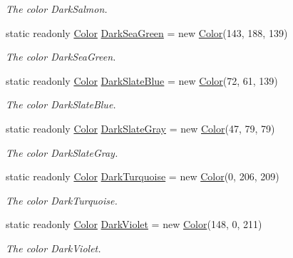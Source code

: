 \begin{DoxyCompactItemize}
\begin{DoxyCompactList}\small\item\em The color Dark\-Salmon. \end{DoxyCompactList}\item 
static readonly \hyperlink{struct_tri_devs_1_1_tri_engine_1_1_color}{Color} \hyperlink{struct_tri_devs_1_1_tri_engine_1_1_color_ace9287f842fa7ca4ad3a1d3e8cf9c90e}{Dark\-Sea\-Green} = new \hyperlink{struct_tri_devs_1_1_tri_engine_1_1_color}{Color}(143, 188, 139)
\begin{DoxyCompactList}\small\item\em The color Dark\-Sea\-Green. \end{DoxyCompactList}\item 
static readonly \hyperlink{struct_tri_devs_1_1_tri_engine_1_1_color}{Color} \hyperlink{struct_tri_devs_1_1_tri_engine_1_1_color_a5ec06788b341277d308f4a5d5e7b7390}{Dark\-Slate\-Blue} = new \hyperlink{struct_tri_devs_1_1_tri_engine_1_1_color}{Color}(72, 61, 139)
\begin{DoxyCompactList}\small\item\em The color Dark\-Slate\-Blue. \end{DoxyCompactList}\item 
static readonly \hyperlink{struct_tri_devs_1_1_tri_engine_1_1_color}{Color} \hyperlink{struct_tri_devs_1_1_tri_engine_1_1_color_aeb2752a4c850993dd7af43c2513759b4}{Dark\-Slate\-Gray} = new \hyperlink{struct_tri_devs_1_1_tri_engine_1_1_color}{Color}(47, 79, 79)
\begin{DoxyCompactList}\small\item\em The color Dark\-Slate\-Gray. \end{DoxyCompactList}\item 
static readonly \hyperlink{struct_tri_devs_1_1_tri_engine_1_1_color}{Color} \hyperlink{struct_tri_devs_1_1_tri_engine_1_1_color_a328b83e3c52e00f60170eb567416c6e1}{Dark\-Turquoise} = new \hyperlink{struct_tri_devs_1_1_tri_engine_1_1_color}{Color}(0, 206, 209)
\begin{DoxyCompactList}\small\item\em The color Dark\-Turquoise. \end{DoxyCompactList}\item 
static readonly \hyperlink{struct_tri_devs_1_1_tri_engine_1_1_color}{Color} \hyperlink{struct_tri_devs_1_1_tri_engine_1_1_color_a7eec7ad88791ffb62aeb5f6395c5ff89}{Dark\-Violet} = new \hyperlink{struct_tri_devs_1_1_tri_engine_1_1_color}{Color}(148, 0, 211)
\begin{DoxyCompactList}\small\item\em The color Dark\-Violet. \end{DoxyCompactList}\item 

\end{DoxyCompactItemize}
